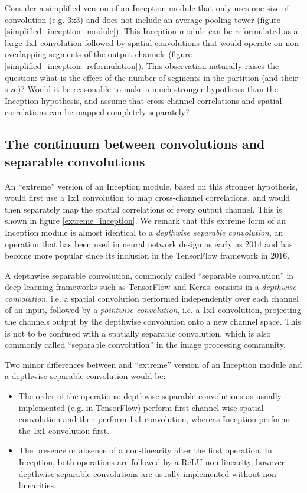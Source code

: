 Consider a simplified version of an Inception module that only uses one size of convolution (e.g. 3x3) and does not include an average pooling tower (figure \ref{simplified_inception_module}). This Inception module can be reformulated as a large 1x1 convolution followed by spatial convolutions that would operate on non-overlapping segments of the output channels (figure \ref{simplified_inception_reformulation}). This observation naturally raises the question: what is the effect of the number of segments in the partition (and their size)? Would it be reasonable to make a much stronger hypothesis than the Inception hypothesis, and assume that cross-channel correlations and spatial correlations can be mapped completely separately?

\subsection{The continuum between convolutions and separable convolutions} 

An ``extreme'' version of an Inception module, based on this stronger hypothesis, would first use a 1x1 convolution to map cross-channel correlations, and would then separately map the spatial correlations of every output channel. This is shown in figure \ref{extreme_inception}. We remark that this extreme form of an Inception module is almost identical to a \textit{depthwise separable convolution}, an operation that has been used in neural network design as early as 2014 \cite{sifre14} and has become more popular since its inclusion in the TensorFlow framework \cite{tensorflow2015-whitepaper} in 2016.

A depthwise separable convolution, commonly called ``separable convolution'' in deep learning frameworks such as TensorFlow and Keras, consists in a \textit{depthwise convolution}, i.e. a spatial convolution performed independently over each channel of an input, followed by a \textit{pointwise convolution}, i.e. a 1x1 convolution, projecting the channels output by the depthwise convolution onto a new channel space. This is not to be confused with a spatially separable convolution, which is also commonly called ``separable convolution'' in the image processing community.

Two minor differences between and ``extreme'' version of an Inception module and a depthwise separable convolution would be:

\begin{itemize}
  \item The order of the operations: depthwise separable convolutions as usually implemented (e.g. in TensorFlow) perform first channel-wise spatial convolution and then perform 1x1 convolution, whereas Inception performs the 1x1 convolution first.
  \item The presence or absence of a non-linearity after the first operation. In Inception, both operations are followed by a ReLU non-linearity, however depthwise separable convolutions are usually implemented without non-linearities.
\end{itemize}

